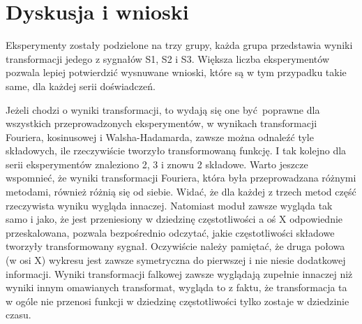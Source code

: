 \documentclass[12pt]{article}
\begin{document}
    \section{Dyskusja i wnioski} {
        Eksperymenty zostały podzielone na trzy grupy, każda grupa
        przedstawia wyniki transformacji jedego z sygnałów S1, S2 i
        S3. Większa liczba eksperymentów pozwala lepiej potwierdzić
        wysnuwane wnioski, które są w tym przypadku takie same, dla
        każdej serii doświadczeń.

        Jeżeli chodzi o wyniki transformacji, to wydają się one
        być poprawne dla wszystkich przeprowadzonych eksperymentów, w
        wynikach transformacji Fouriera, kosinusowej i
        Walsha-Hadamarda, zawsze można odnaleźć tyle składowych, ile
        rzeczywiście tworzyło transformowaną funkcję. I tak kolejno
        dla serii eksperymentów znaleziono 2, 3 i znowu 2 składowe.
        Warto jeszcze wspomnieć, że wyniki transformacji Fouriera,
        która była przeprowadzana różnymi metodami, również różnią się
        od siebie. Widać, że dla każdej z trzech metod część
        rzeczywista wyniku wygląda innaczej. Natomiast moduł zawsze
        wygląda tak samo i jako, że jest przeniesiony w dziedzinę
        częstotliwości a oś X odpowiednie przeskalowana, pozwala
        bezpośrednio odczytać, jakie częstotliwości składowe tworzyły
        transformowany sygnał. Oczywiście należy pamiętać, że druga
        połowa (w osi X) wykresu jest zawsze symetryczna do pierwszej
        i nie niesie dodatkowej informacji. Wyniki transformacji
        falkowej zawsze wyglądają zupełnie innaczej niż wyniki innym
        omawianych transformat, wygląda to z faktu, że transformacja
        ta w ogóle nie przenosi funkcji w dziedzinę częstotliwości
        tylko zostaje w dziedzinie czasu.

}
\end{document}
